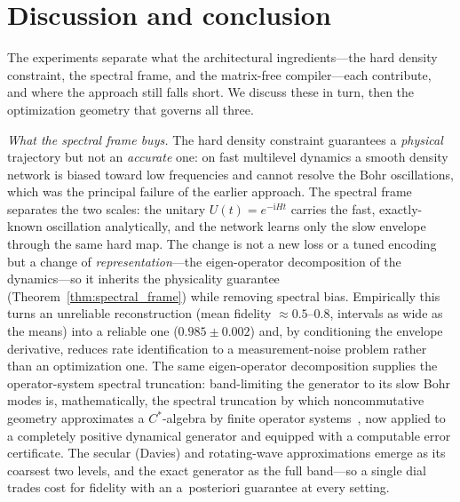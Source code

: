 \documentclass[twocolumn,aps,prxquantum,superscriptaddress,nofootinbib,floatfix,longbibliography]{revtex4-2}
\newcommand{\ii}{\mathrm{i}}
\newcommand{\sync}[1]{#1}
\begin{document}
\section{Discussion and conclusion}
\label{sec:discussion}

The experiments separate what the architectural ingredients---the hard density constraint, the spectral frame, and the matrix-free compiler---each contribute, and where the approach still falls short. We discuss these in turn, then the optimization geometry that governs all three.

\emph{What the spectral frame buys.} The hard density constraint guarantees a \emph{physical} trajectory but not an \emph{accurate} one: on fast multilevel dynamics a smooth density network is biased toward low frequencies and cannot resolve the Bohr oscillations, which was the principal failure of the earlier approach. The spectral frame separates the two scales: the unitary $U(t)=e^{-\ii Ht}$ carries the fast, exactly-known oscillation analytically, and the network learns only the slow envelope through the same hard map. The change is not a new loss or a tuned encoding but a change of \emph{representation}---the eigen-operator decomposition of the dynamics---so it inherits the physicality guarantee (Theorem~\ref{thm:spectral_frame}) while removing spectral bias. Empirically this turns an unreliable reconstruction (mean fidelity $\approx0.5$--$0.8$, intervals as wide as the means) into a reliable one ($\sync{0.985}\pm\sync{0.002}$) and, by conditioning the envelope derivative, reduces rate identification to a measurement-noise problem rather than an optimization one. The same eigen-operator decomposition supplies the operator-system spectral truncation: band-limiting the generator to its slow Bohr modes is, mathematically, the spectral truncation by which noncommutative geometry approximates a $C^*$-algebra by finite operator systems~\cite{connes2021spectral,hashimoto2024spectral}, now applied to a completely positive dynamical generator and equipped with a computable error certificate. The secular (Davies) and rotating-wave approximations emerge as its coarsest two levels, and the exact generator as the full band---so a single dial trades cost for fidelity with an a~posteriori guarantee at every setting.
\end{document}
